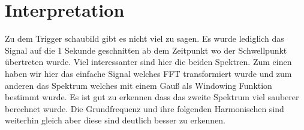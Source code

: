 \section{Interpretation}
\label{chap:VERSUCH_1_INTERPRETATION}
Zu dem Trigger schaubild gibt es nicht viel zu sagen. Es wurde lediglich das Signal auf die 1 Sekunde geschnitten ab dem Zeitpunkt wo der Schwellpunkt übertreten wurde.
Viel interessanter sind hier die beiden Spektren. Zum einen haben wir hier das einfache Signal welches FFT transformiert wurde
und zum anderen das Spektrum welches mit einem Gauß als Windowing Funktion bestimmt wurde.
Es ist gut zu erkennen dass das zweite Spektrum viel sauberer berechnet wurde. Die Grundfrequenz und ihre folgenden Harmonischen
sind weiterhin gleich aber diese sind deutlich besser zu erkennen.